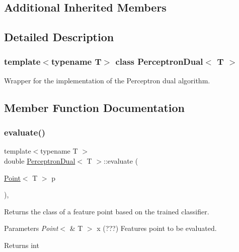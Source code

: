\subsection*{Additional Inherited Members}


\subsection{Detailed Description}
\subsubsection*{template$<$typename T$>$\newline
class Perceptron\+Dual$<$ T $>$}

Wrapper for the implementation of the Perceptron dual algorithm. 

\subsection{Member Function Documentation}
\mbox{\label{class_perceptron_dual_afae65908732e5f011be1d384387c71fe}} 
\subsubsection{\texorpdfstring{evaluate()}{evaluate()}}
{\footnotesize\ttfamily template$<$typename T $>$ \\
double \mbox{\hyperlink{class_perceptron_dual}{Perceptron\+Dual}}$<$ T $>$\+::evaluate (\begin{DoxyParamCaption}\item[{\mbox{\hyperlink{class_point}{Point}}$<$ T $>$}]{p }\end{DoxyParamCaption})\hspace{0.3cm}{\ttfamily [override]}, {\ttfamily [virtual]}}



Returns the class of a feature point based on the trained classifier. 


\begin{DoxyParams}{Parameters}
{\em Point$<$} & T $>$ x (???) Features point to be evaluated. \\
\hline
\end{DoxyParams}
\begin{DoxyReturn}{Returns}
int 
\end{DoxyReturn}


